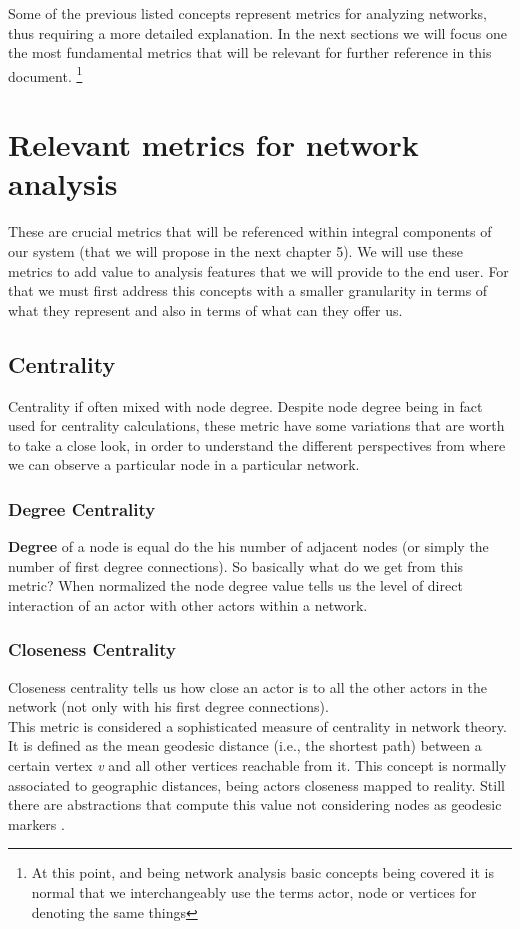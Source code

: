 Some of the previous listed concepts represent metrics for analyzing networks, thus requiring a more detailed explanation. In the next sections we will focus one the most fundamental metrics that will be relevant for further reference in this document. \footnote{At this point, and being network analysis basic concepts being covered it is normal that we interchangeably use the terms actor, node or vertices for denoting the same things}

\section{Relevant metrics for network analysis}
These are crucial metrics that will be referenced within integral components of our system (that we will propose in the next chapter 5). We will use these metrics to add value to analysis features that we will provide to the end user. For that we must first address this concepts with a smaller granularity in terms of
what they represent and also in terms of what can they offer us.

\subsection{Centrality}
Centrality if often mixed with node degree. Despite node degree being in fact used for centrality calculations, these metric have some variations
that are worth to take a close look, in order to understand the different perspectives from where we can observe a particular node in a particular network.

\subsubsection*{Degree Centrality}
\textbf{Degree} of a node is equal do the his number of adjacent nodes (or simply the number of first degree connections).
So basically what do we get from this metric? When normalized the node degree value tells us the level of direct interaction of an actor with other
actors within a network.

\subsubsection*{Closeness Centrality}
Closeness centrality tells us how close an actor is to all the other actors in the network (not only with his first degree connections).\\
\indent This metric is considered a sophisticated measure of centrality in network theory. It is defined as the mean geodesic distance
(i.e., the shortest path) between a certain vertex \textit{v} and all other vertices reachable from it. This concept is normally associated to
geographic distances, being actors closeness mapped to reality. Still there are abstractions that compute
this value not considering nodes as geodesic markers \citep{politaktivsna}.

